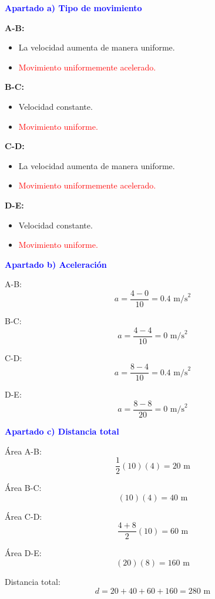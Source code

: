 \begin{exercise}
\begin{solu}
    \textbf{\textcolor{blue}{Apartado a) Tipo de movimiento}}

    \textbf{A-B:}
    \begin{itemize}
        \item La velocidad aumenta de manera uniforme.
        \item \textcolor{red}{Movimiento uniformemente acelerado.}
    \end{itemize}

    \textbf{B-C:}
    \begin{itemize}
        \item Velocidad constante.
        \item \textcolor{red}{Movimiento uniforme.}
    \end{itemize}

    \textbf{C-D:}
    \begin{itemize}
        \item La velocidad aumenta de manera uniforme.
        \item \textcolor{red}{Movimiento uniformemente acelerado.}
    \end{itemize}

    \textbf{D-E:}
    \begin{itemize}
        \item Velocidad constante.
        \item \textcolor{red}{Movimiento uniforme.}
    \end{itemize}

    \textbf{\textcolor{blue}{Apartado b) Aceleración}}

    A-B:
    \[
    a=\frac{4-0}{10}=0.4\text{ m/s}^2
    \]

    B-C:
    \[
    a=\frac{4-4}{10}=0\text{ m/s}^2
    \]

    C-D:
    \[
    a=\frac{8-4}{10}=0.4\text{ m/s}^2
    \]

    D-E:
    \[
    a=\frac{8-8}{20}=0\text{ m/s}^2
    \]

    \textbf{\textcolor{blue}{Apartado c) Distancia total}}

    Área A-B:
    \[
    \frac12(10)(4)=20\text{ m}
    \]

    Área B-C:
    \[
    (10)(4)=40\text{ m}
    \]

    Área C-D:
    \[
    \frac{4+8}{2}(10)=60\text{ m}
    \]

    Área D-E:
    \[
    (20)(8)=160\text{ m}
    \]

    Distancia total:
    \[
    d=20+40+60+160=\boxed{280\text{ m}}
    \]

    \end{solu}
\end{exercise}

